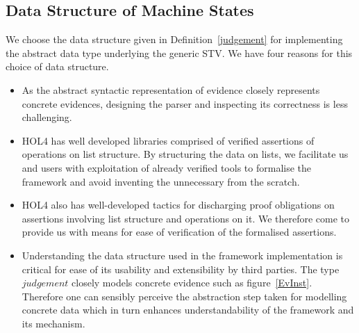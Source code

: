 \documentclass[10pt,conference]{IEEEtran}
\begin{document}
\subsection{Data Structure of Machine States}
\label{MachineData}
 We choose the data structure  given in Definition~\ref{judgement} for implementing the abstract data type underlying the generic STV.  We have four reasons for this choice of data structure. 
 \begin{itemize}
\item As the abstract syntactic representation of evidence closely represents concrete evidences, designing the parser and inspecting  its  correctness is less challenging.  
 \item HOL4 has well developed libraries comprised of verified assertions of operations on list structure. By structuring the data on lists, we facilitate us and users  with exploitation of  already verified tools to formalise the framework and avoid inventing the unnecessary from the scratch. 
 \item HOL4 also has well-developed tactics for discharging proof obligations on assertions involving list structure and operations on it. We therefore come to provide us with means for ease of verification of the formalised assertions.
 \item Understanding the data structure used in the  framework implementation is critical for ease of  its usability and extensibility by third parties.  The type $\mathit{judgement}$ closely models concrete evidence such as figure~\ref{EvInst}. Therefore one can sensibly perceive the  abstraction step taken for modelling  concrete data which in turn enhances understandability of the framework and its mechanism. 
   \end{itemize}
\end{document}
